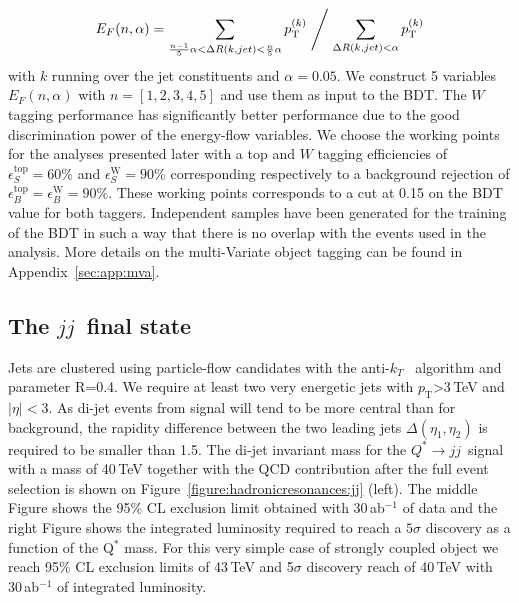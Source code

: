 \documentclass[a4paper,11pt]{article}
\newcommand{\ptSup}[1]{\ensuremath{p_{\text{T}}^{#1}}}
\newcommand{\pt}{\ensuremath{p_{\text{T}}}}
\newcommand*{\qjj}{\ensuremath{Q^{*} \rightarrow jj}}
\newcommand*{\jj}{\ensuremath{jj}}
\begin{document}
\begin{equation}
E_{F}(n,\alpha) =  \sum \limits_{\frac{n-1}{5}\alpha < \Delta R(k,jet)< \frac{n}{5}\alpha} \ptSup{(k)} \Biggm/ \sum \limits_{\Delta R(k,jet)< \alpha} \ptSup{(k)}
\end{equation}
with $k$ running over the jet constituents and $\alpha=0.05$. We construct 5 variables $E_{F}(n,\alpha)$ with $n=[1,2,3,4,5]$ and use them as input to the BDT.
The $W$ tagging performance has significantly better performance due to the good discrimination power of the energy-flow variables. We choose the working points for the analyses presented later with a top and $W$ tagging efficiencies of $\epsilon_S^{\text{top}}=60\%$ and $\epsilon_S^{\text{W}}=90\%$ corresponding respectively to a background rejection of $\epsilon_B^{\text{top}}=\epsilon_B^{\text{W}}=90\%$. These working points corresponds to a cut at 0.15 on the BDT value for both taggers. Independent samples have been generated for the training of the BDT in such a way that there is no overlap with the events used in the analysis.  More details on the multi-Variate object tagging can be found in Appendix~\ref{sec:app:mva}.

\subsection{The \jj\ final state}
\label{sec:hadjj}

Jets are clustered using particle-flow candidates with the anti-$k_T$~\cite{Cacciari:2008gp} algorithm and  parameter R=0.4. We require at least two very energetic jets with $\pt$>3\,TeV and $|\eta|<3$. As di-jet events from signal will tend to be more central than for background, the rapidity difference between the two leading jets $\Delta(\eta_1, \eta_2)$ is required to be smaller than 1.5. The di-jet invariant mass for the \qjj\ signal with a mass of 40\,TeV together with the QCD contribution after the full event selection is shown on Figure~\ref{figure:hadronicresonances:jj} (left). The middle Figure shows the 95\% CL exclusion limit obtained with 30\,ab$^{-1}$ of data and the right Figure shows the integrated luminosity required to reach a $5\sigma$ discovery as a function of the Q$^*$ mass. For this very simple case of strongly coupled object we reach 95\% CL exclusion limits of 43\,TeV and 5$\sigma$ discovery reach of 40\,TeV with 30\,ab$^{-1}$ of integrated luminosity. 
\end{document}
